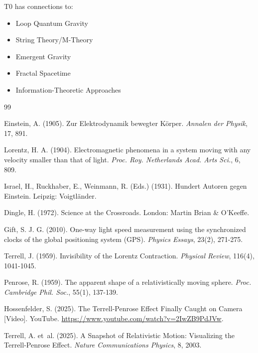 	T0 has connections to:
	\begin{itemize}
		\item Loop Quantum Gravity \cite{rovelli2004, ashtekar2004}
		\item String Theory/M-Theory \cite{polchinski1998, becker2007}
		\item Emergent Gravity \cite{verlinde2011, jacobson1995}
		\item Fractal Spacetime \cite{nottale1993, elnaschie2004}
		\item Information-Theoretic Approaches \cite{susskind1995, maldacena1998}
	\end{itemize}
	
	\begin{thebibliography}{99}
		
		Einstein, A. (1905). Zur Elektrodynamik bewegter Körper. \emph{Annalen der Physik}, 17, 891.
		
		Lorentz, H. A. (1904). Electromagnetic phenomena in a system moving with any velocity smaller than that of light. \emph{Proc. Roy. Netherlands Acad. Arts Sci.}, 6, 809.
		
		Israel, H., Ruckhaber, E., Weinmann, R. (Eds.) (1931). Hundert Autoren gegen Einstein. Leipzig: Voigtländer.
		
		Dingle, H. (1972). Science at the Crossroads. London: Martin Brian \& O'Keeffe.
		
		Gift, S. J. G. (2010). One-way light speed measurement using the synchronized clocks of the global positioning system (GPS). \emph{Physics Essays}, 23(2), 271-275.
		
		Terrell, J. (1959). Invisibility of the Lorentz Contraction. \emph{Physical Review}, 116(4), 1041-1045.
		
		Penrose, R. (1959). The apparent shape of a relativistically moving sphere. \emph{Proc. Cambridge Phil. Soc.}, 55(1), 137-139.
		
		Hossenfelder, S. (2025). The Terrell-Penrose Effect Finally Caught on Camera [Video]. YouTube. \url{https://www.youtube.com/watch?v=2IwZB9PdJVw}.
		
		Terrell, A. et~al. (2025). A Snapshot of Relativistic Motion: Visualizing the Terrell-Penrose Effect. \emph{Nature Communications Physics}, 8, 2003.
		

\end{thebibliography}
